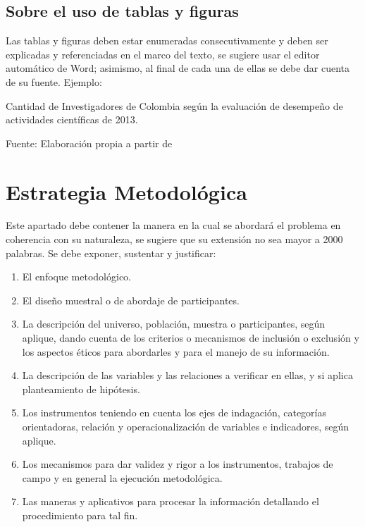 \documentclass[spanish, 12pt, letterpaper]{poli}
\begin{document}
\subsection{Sobre el uso de tablas y figuras}
Las tablas y figuras deben estar enumeradas consecutivamente y deben ser explicadas y referenciadas en el marco del texto, se sugiere usar el editor automático de Word; asimismo, al final de cada una de ellas se debe dar cuenta de su fuente. Ejemplo:

\begin{table}[h]
	\color{poliBlue}
	\caption{Cantidad de Investigadores de Colombia según la evaluación de desempeño de actividades científicas de 2013.}
	\label{tab:caption}
	\begin{center}
	\end{center}
	Fuente: Elaboración propia a partir de 
\end{table}


\section{Estrategia Metodológica}
Este apartado debe contener la manera en la cual se abordará el problema en coherencia con su naturaleza, se sugiere que su extensión no sea mayor a 2000 palabras. Se debe exponer, sustentar y justificar:

\begin{enumerate}
	\item El enfoque metodológico.
	\item El diseño muestral o de abordaje de participantes.
	\item La descripción del universo, población, muestra o participantes, según aplique, dando cuenta de los criterios o mecanismos de inclusión o exclusión y los aspectos éticos para abordarles y para el manejo de su información.
	\item La descripción de las variables y las relaciones a verificar en ellas, y si aplica planteamiento de hipótesis.
	\item Los instrumentos teniendo en cuenta los ejes de indagación, categorías orientadoras, relación y operacionalización de variables e indicadores, según aplique.
	\item Los mecanismos para dar validez y rigor a los instrumentos, trabajos de campo y en general la ejecución metodológica.
	\item Las maneras y aplicativos para procesar la información detallando el procedimiento para tal fin.
\end{enumerate}
\end{document}
